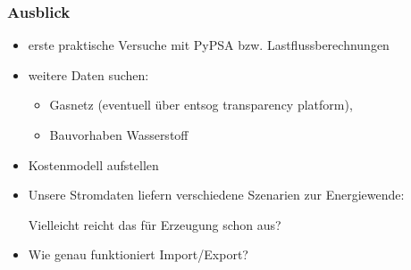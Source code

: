 \documentclass[aspectratio=169,t]{beamer}
\begin{document}
	\begin{frame}
		\frametitle{Ausblick}
		
		\vspace*{6mm}
		\begin{itemize}
			\item erste praktische Versuche mit PyPSA bzw. Lastflussberechnungen
			\item weitere Daten suchen:
			\begin{itemize}
				\item Gasnetz (eventuell über entsog transparency platform),
				\item Bauvorhaben Wasserstoff
			\end{itemize}
			\item Kostenmodell aufstellen
			\item Unsere Stromdaten liefern verschiedene Szenarien zur Energiewende:
			
			Vielleicht reicht das für Erzeugung schon aus? 
			\item Wie genau funktioniert Import/Export?
		\end{itemize}
			
		
	\end{frame}
	
	
	
	
	
	
\end{document}
